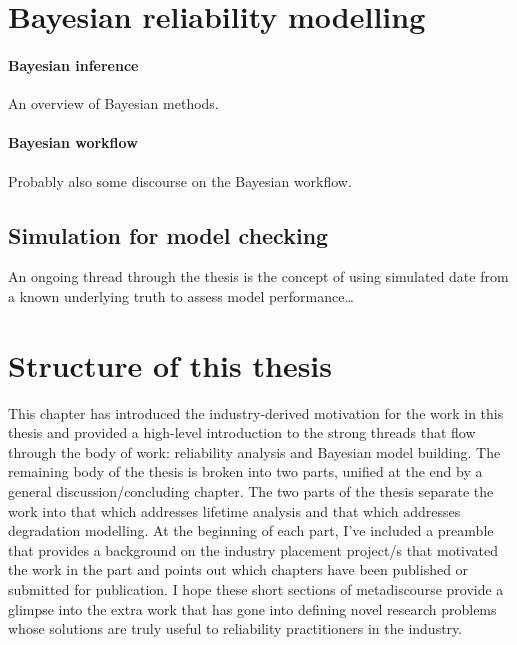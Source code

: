 \section{Bayesian reliability modelling}
\label{sec:Bayesian-methods}
\paragraph*{Bayesian inference}
An overview of Bayesian methods.

\paragraph*{Bayesian workflow}
Probably also some discourse on the Bayesian workflow.

\subsection{Simulation for model checking}

An ongoing thread through the thesis is the concept of using simulated date from a known underlying truth to assess model performance\ldots

\section{Structure of this thesis}
\label{sec:thesis-structure}

This chapter has introduced the industry-derived motivation for the work in this thesis and provided a high-level introduction to the strong threads that flow through the body of work: reliability analysis and Bayesian model building. The remaining body of the thesis is broken into two parts, unified at the end by a general discussion/concluding chapter. The two parts of the thesis separate the work into that which addresses lifetime analysis and that which addresses degradation modelling. At the beginning of each part, I've included a preamble that provides a background on the industry placement project/s that motivated the work in the part and points out which chapters have been published or submitted for publication. I hope these short sections of metadiscourse provide a glimpse into the extra work that has gone into defining novel research problems whose solutions are truly useful to reliability practitioners in the industry.

